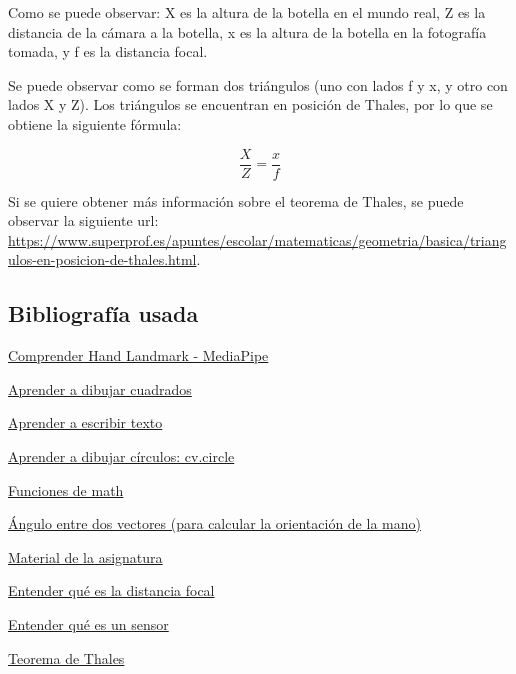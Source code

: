 \documentclass[12pt]{article}
\begin{document}
Como se puede observar: X es la altura de la botella en el mundo real, Z es la distancia de la cámara a la botella, x es la altura de la botella en la fotografía tomada, y f es la distancia focal.

Se puede observar como se forman dos triángulos (uno con lados f y x, y otro con lados X y Z). Los triángulos se encuentran en posición de Thales, por lo que se obtiene la siguiente fórmula:

$$\frac{X}{Z}=\frac{x}{f}$$

Si se quiere obtener más información sobre el teorema de Thales, se puede observar la siguiente url: \url{https://www.superprof.es/apuntes/escolar/matematicas/geometria/basica/triangulos-en-posicion-de-thales.html}.

\subsection*{Bibliografía usada}
\href{https://github.com/google/mediapipe/blob/master/docs/solutions/hands.md}{Comprender Hand Landmark - MediaPipe}

\href{https://docs.opencv.org/3.4/d6/d6e/group__imgproc__draw.html#ga07d2f74cadcf8e305e810ce8eed13bc9}{Aprender a dibujar cuadrados}

\href{https://docs.opencv.org/3.4/d6/d6e/group__imgproc__draw.html#ga5126f47f883d730f633d74f07456c576}{Aprender a escribir texto}

\href{https://docs.opencv.org/3.4/d6/d6e/group__imgproc__draw.html#gaf10604b069374903dbd0f0488cb43670}{Aprender a dibujar círculos: cv.circle}

\href{https://docs.python.org/3/library/math.html}{Funciones de math}

\href{https://www.superprof.es/apuntes/escolar/matematicas/analitica/vectores/angulo-de-dos-vectores.html}{Ángulo entre dos vectores (para calcular la orientación de la mano)}

\href{https://github.com/albertoruiz/umucv/blob/master/notebooks/imagen.ipynb}{Material de la asignatura}

\href{https://www.sony.es/electronics/support/articles/00267921}{Entender qué es la distancia focal}

\href{https://www.blogdelfotografo.com/tipos-caracteristicas-ventajas-sensores-camaras-fotos/}{Entender qué es un sensor}

\href{https://www.superprof.es/apuntes/escolar/matematicas/geometria/basica/triangulos-en-posicion-de-thales.html}{Teorema de Thales}
\end{document}
